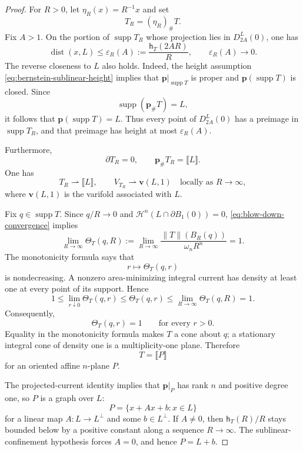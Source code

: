 \documentclass[11pt,reqno]{amsart}
\numberwithin{equation}{section}
\theoremstyle{definition}
\theoremstyle{remark}
\begin{document}
\begin{proof}
For $R>0$, let $\eta_R(x)=R^{-1}x$ and set
\[
  T_R=(\eta_R)_\#T.
\]
Fix $A>1$.  On the portion of $\operatorname{supp}T_R$ whose projection
lies in $D_{2A}^L(0)$, one has
\begin{equation}
  \operatorname{dist}(x,L)
  \leq\varepsilon_R(A)
  :=\frac{\mathsf h_T(2AR)}{R},
  \qquad
  \varepsilon_R(A)\longrightarrow0.
  \label{eq:blow-down-height}
\end{equation}
The reverse closeness to $L$ also holds.  Indeed, the height assumption \eqref{eq:bernstein-sublinear-height} implies that
$\mathbf p|_{\operatorname{supp}T}$ is proper and
$\mathbf p(\operatorname{supp}T)$ is closed.  Since
\[
  \operatorname{supp}(\mathbf p_\#T)=L,
\]
it follows that $\mathbf p(\operatorname{supp}T)=L$.  Thus every point of
$D_{2A}^L(0)$ has a preimage in $\operatorname{supp}T_R$, and that preimage
has height at most $\varepsilon_R(A)$.

Furthermore,
\[
  \partial T_R=0,
  \qquad
  \mathbf p_\#T_R=\llbracket L\rrbracket.
\]
One has
\begin{equation}
  T_R\rightharpoonup\llbracket L\rrbracket,
  \qquad
  V_{T_R}\rightharpoonup\mathbf v(L,1)
  \quad\text{locally as }R\to\infty,
  \label{eq:blow-down-convergence}
\end{equation}
where $\mathbf v(L,1)$ is the varifold associated with $L.$

Fix $q\in\operatorname{supp}T$.  Since $q/R\to0$ and
$\mathcal H^n(L\cap\partial B_1(0))=0$,
\eqref{eq:blow-down-convergence} implies
\begin{equation}
  \lim_{R\to\infty} \Theta_T(q,R):= \lim_{R\to\infty}
  \frac{\|T\|(B_R(q))}{\omega_nR^n}=1.
  \label{eq:density-at-infinity}
\end{equation}
The monotonicity formula says that
\[
  r\longmapsto\Theta_T(q,r)
\]
is nondecreasing.  A nonzero area-minimizing integral current has density
at least one at every point of its support.  Hence
\[
  1\leq\lim_{r\downarrow0}\Theta_T(q,r)
  \leq\Theta_T(q,r)
  \leq\lim_{R\to\infty}\Theta_T(q,R)=1.
\]
Consequently,
\begin{equation}
  \Theta_T(q,r)=1
  \qquad\text{for every }r>0.
  \label{eq:all-mass-ratios-one}
\end{equation}
Equality in the monotonicity formula makes $T$ a cone about $q$; a
stationary integral cone of density one is a multiplicity-one plane.
Therefore
\[
  T=\llbracket P\rrbracket
\]
for an oriented affine $n$-plane $P$.

The projected-current identity implies that $\mathbf p|_P$ has rank $n$
and positive degree one, so $P$ is a graph over $L$:
\[
  P=\{x+Ax+b:x\in L\}
\]
for a linear map $A:L\to L^\perp$ and some $b\in L^\perp$.  If $A\neq0$,
then $\mathsf h_T(R)/R$ stays bounded below by a positive constant along a
sequence $R\to\infty$.  The sublinear-confinement hypothesis forces
$A=0$, and hence $P=L+b$.
\end{proof}
\end{document}
